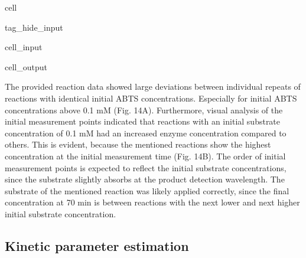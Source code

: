 \documentclass[letterpaper,12pt,english]{jupyterBook}
\begin{document}
\begin{sphinxuseclass}{cell}
\begin{sphinxuseclass}{tag_hide_input}
\begin{sphinxVerbatimInput}
\begin{sphinxuseclass}{cell_input}
\begin{sphinxVerbatim}[commandchars=\\\{\}]
\end{sphinxVerbatim}

\end{sphinxuseclass}\end{sphinxVerbatimInput}
\begin{sphinxVerbatimOutput}

\begin{sphinxuseclass}{cell_output}
\noindent{}

\end{sphinxuseclass}\end{sphinxVerbatimOutput}

\end{sphinxuseclass}
\end{sphinxuseclass}
\sphinxAtStartPar
{}

\sphinxAtStartPar
The provided reaction data showed large deviations between individual repeats of reactions with identical initial ABTS concentrations. Especially for initial ABTS concentrations above 0.1 mM (Fig. 14A).
Furthermore, visual analysis of the initial measurement points indicated that reactions with an initial substrate concentration of 0.1 mM had an increased enzyme concentration compared to others. This is evident, because the mentioned reactions show the highest concentration at the initial measurement time (Fig. 14B). The order of initial measurement points is expected to reflect the initial substrate concentrations, since the substrate slightly absorbs at the product detection wavelength. The substrate of the mentioned reaction was likely applied correctly, since the final concentration at 70 min is between reactions with the next lower and next higher initial substrate concentration.


\subsection{Kinetic parameter estimation}
\label{\detokenize{scenarios/enzyme_inactivation:kinetic-parameter-estimation}}
\end{document}
